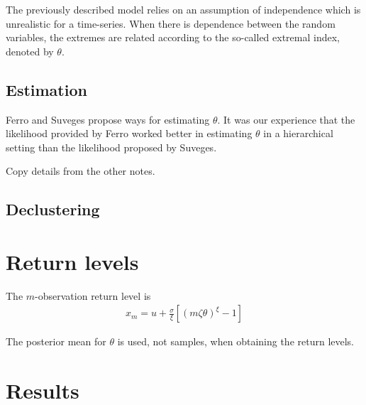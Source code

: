 \documentclass[12pt]{article}
\begin{document}
The previously described model relies on an assumption of independence which is unrealistic for a time-series. When there is dependence between the random variables, the extremes are related according to the so-called extremal index, denoted by $\theta$.

\subsection{Estimation}

Ferro and Suveges propose ways for estimating $\theta$. It was our experience that the likelihood provided by Ferro worked better in estimating $\theta$ in a hierarchical setting than the likelihood proposed by Suveges. 

Copy details from the other notes.

\subsection{Declustering}



\section{Return levels}
\label{return}

The $m$-observation return level is
\begin{align}
x_m = u +\frac{\sigma}{\xi}\left[\left(m\zeta\theta\right)^\xi-1\right] \label{rl}
\end{align}

The posterior mean for $\theta$ is used, not samples, when obtaining the return levels.


\section{Results}
\label{results}
\end{document}
